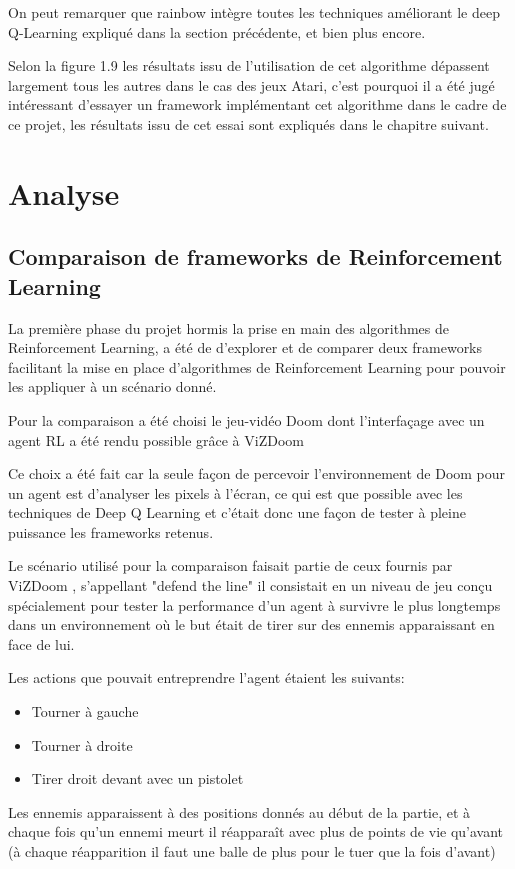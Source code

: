 \documentclass[a4paper,10pt,openany,oneside]{report}
\begin{document}
On peut remarquer que rainbow intègre toutes les techniques améliorant le deep Q-Learning expliqué dans la section précédente, et bien plus encore.

Selon la figure 1.9 les résultats issu de l'utilisation de cet algorithme dépassent largement tous les autres dans le cas des jeux Atari, c'est pourquoi il a été jugé intéressant d'essayer un framework implémentant cet algorithme dans le cadre de ce projet, les résultats issu de cet essai sont expliqués dans le chapitre suivant.

\chapter{Analyse}
\thispagestyle{headings}

\section{Comparaison de frameworks de Reinforcement Learning}
La première phase du projet hormis la prise en main des algorithmes de Reinforcement Learning, a été de d'explorer et de comparer deux frameworks facilitant la mise en place d'algorithmes de Reinforcement Learning pour pouvoir les appliquer à un scénario donné.

Pour la comparaison a été choisi le jeu-vidéo Doom dont l'interfaçage avec un agent RL a été rendu possible grâce à ViZDoom \cite[] {Kempka2016ViZDoom}

Ce choix a été fait car la seule façon de percevoir l'environnement de Doom pour un agent est d'analyser les pixels à l'écran, ce qui est que possible avec les techniques de Deep Q Learning et c'était donc une façon de tester à pleine puissance les frameworks retenus.

Le scénario utilisé pour la comparaison faisait partie de ceux fournis par ViZDoom \cite[]{vizDoomScenario}, s'appellant "defend the line" il consistait en un niveau de jeu conçu spécialement pour tester la performance d'un agent à survivre le plus longtemps dans un environnement où le but était de tirer sur des ennemis apparaissant en face de lui.

Les actions que pouvait entreprendre l'agent étaient les suivants:
\begin{itemize}
	\item Tourner à gauche
	\item Tourner à droite
	\item Tirer droit devant avec un pistolet
\end{itemize}
Les ennemis apparaissent à des positions donnés au début de la partie, et à chaque fois qu'un ennemi meurt il réapparaît avec plus de points de vie qu'avant (à chaque réapparition il faut une balle de plus pour le tuer que la fois d'avant)
\end{document}
